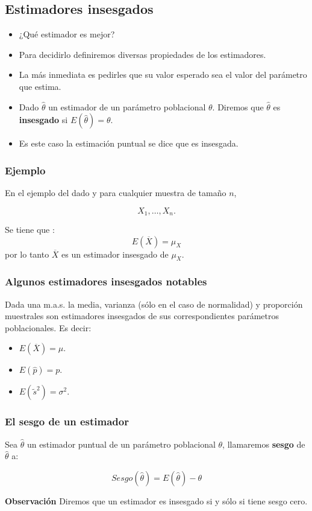 \begin{frame}
     \subsection{Estimadores insesgados}
\begin{itemize}
\item ¿Qué estimador es mejor?
\item Para decidirlo definiremos diversas propiedades de los estimadores.
\item      La más inmediata es pedirles que su valor esperado sea el valor del parámetro que estima.
\item Dado $\hat{\theta}$ un estimador de un parámetro poblacional
     $\theta$. Diremos que $\hat{\theta}$ es \textbf{ insesgado} si
     $E(\hat{\theta})=\theta$.
\item   Es este caso la estimación puntual se dice que es insesgada.
\end{itemize}
\end{frame}

\begin{frame}
 \frametitle{Ejemplo}
En el ejemplo del dado  y para cualquier muestra de tamaño  $n$, 

$$X_{1},\ldots,X_{n}.$$

Se tiene que :
         $$E(\overline{X})=\mu_{X}$$
 por lo tanto $\overline{X}$ es un estimador insesgado de $\mu_{X}$.
 

\end{frame}

\begin{frame}

\frametitle{Algunos estimadores insesgados notables}
Dada una m.a.s. la media, varianza (sólo en el caso de normalidad) y proporción muestrales son estimadores insesgados de
sus correspondientes parámetros poblacionales. Es decir:

\begin{itemize}
\item $E(\overline{X})=\mu$.
\item $E(\hat{p})=p$.
\item $E(\tilde{s}^2)=\sigma^2.$
\end{itemize}
\end{frame}

\begin{frame}
\frametitle{El sesgo de un estimador}
Sea $\hat{\theta}$ un estimador puntual de un parámetro
poblacional $\theta$, llamaremos \textbf{sesgo} de $\hat{\theta}$ a:

$$Sesgo(\hat{\theta})=E(\hat{\theta})-\theta$$

\textbf{Observación} Diremos que  un estimador es insesgado si y sólo si tiene sesgo cero.
\end{frame}

